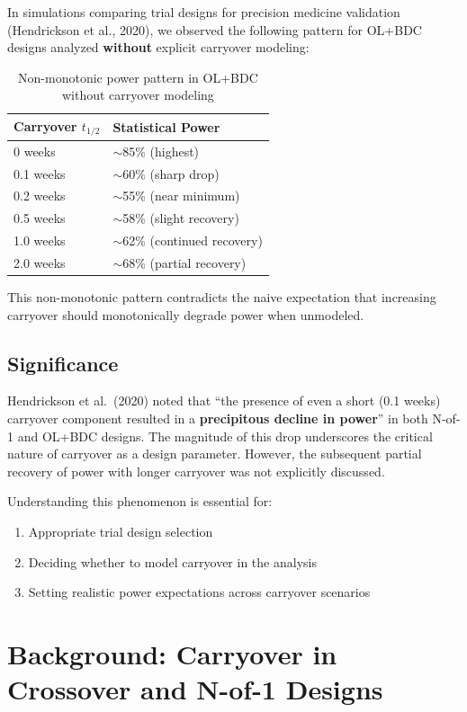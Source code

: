 \documentclass[11pt,a4paper]{article}
\begin{document}
In simulations comparing trial designs for precision medicine validation
(Hendrickson et al., 2020), we observed the following pattern for OL+BDC designs
analyzed \textbf{without} explicit carryover modeling:

\begin{table}[H]
\centering
\begin{tabular}{@{}ll@{}}
\toprule
\textbf{Carryover $t_{1/2}$} & \textbf{Statistical Power} \\
\midrule
0 weeks & $\sim$85\% (highest) \\
0.1 weeks & $\sim$60\% (sharp drop) \\
0.2 weeks & $\sim$55\% (near minimum) \\
0.5 weeks & $\sim$58\% (slight recovery) \\
1.0 weeks & $\sim$62\% (continued recovery) \\
2.0 weeks & $\sim$68\% (partial recovery) \\
\bottomrule
\end{tabular}
\caption{Non-monotonic power pattern in OL+BDC without carryover modeling}
\end{table}

This non-monotonic pattern contradicts the naive expectation that increasing
carryover should monotonically degrade power when unmodeled.

\subsection{Significance}

Hendrickson et al.\ (2020) noted that ``the presence of even a short (0.1 weeks)
carryover component resulted in a \textbf{precipitous decline in power}'' in both N-of-1
and OL+BDC designs. The magnitude of this drop underscores the critical nature
of carryover as a design parameter. However, the subsequent partial recovery of
power with longer carryover was not explicitly discussed.

Understanding this phenomenon is essential for:
\begin{enumerate}
    \item Appropriate trial design selection
    \item Deciding whether to model carryover in the analysis
    \item Setting realistic power expectations across carryover scenarios
\end{enumerate}

\section{Background: Carryover in Crossover and N-of-1 Designs}
\end{document}
